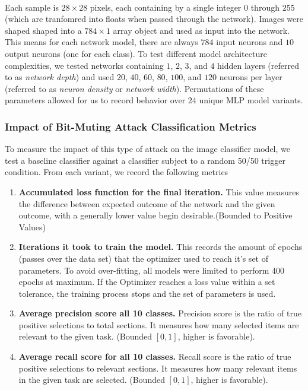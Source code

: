\documentclass[12pt,letterpaper]{article}
\begin{document}
\paragraph*{}Each sample is $28 \times 28$ pixels, each containing by a single integer $0$ through $255$ (which are tranfomred into floats when passed through the network). Images were shaped shaped into a $784 \times 1$ array object and used as input into the network. This means for each network model, there are always $784$ input neurons and $10$ output neurons (one for each class). To test different model architecture complexities, we tested networks containing $1$, $2$, $3$, and $4$ hidden layers (referred to as \textit{network depth}) and used $20$, $40$, $60$, $80$, $100$, and $120$ neurons per layer (referred to as \textit{neuron density} or \textit{network width}). Permutations of these parameters allowed for us to record behavior over $24$ unique MLP model variants.

\subsubsection{Impact of Bit-Muting Attack Classification Metrics}

To measure the impact of this type of attack on the image classifier model, we test a baseline classifier against a classifier subject to a random 50/50 trigger condition. From each variant, we record the following metrics

\begin{enumerate}
\item \textbf{Accumulated loss function for the final iteration.} This value measures the difference between expected outcome of the network and the given outcome, with a generally lower value begin desirable.(Bounded to Positive Values)
\item \textbf{Iterations it took to train the model.} This records the amount of epochs (passes over the data set) that the optimizer used to reach it's set of parameters. To avoid over-fitting, all models were limited to perform 400 epochs at maximum. If the Optimizer reaches a loss value within a set tolerance, the training process stops and the set of parameters is used. 
\item \textbf{Average precision score all 10 classes.} Precision score is the ratio of true positive selections to total sections. It measures how many selected items are relevant to the given task. (Bounded $[0,1]$, higher is favorable).
\item \textbf{Average recall score for all 10 classes.} Recall score is the ratio of true positive selections to relevant sections. It measures how many relevant items in the given task are selected. (Bounded $[0,1]$, higher is favorable).
\end{enumerate} 
\end{document}
